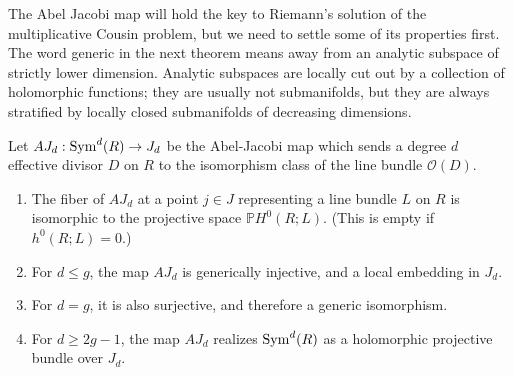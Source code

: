 \documentclass[12pt]{article}
\begin{document}
The Abel Jacobi map will hold the key to Riemann's solution of the multiplicative Cousin problem,
but we need to settle some of its properties first.
The word generic in the next theorem means
away from an analytic subspace of strictly lower dimension.
Analytic subspaces are locally cut out by a collection of holomorphic functions; they are usually not submanifolds,
but they are always stratified by locally closed submanifolds of decreasing dimensions.

\begin{theorem}
    Let $AJ_d : \operatorname{Sym}^d(R) \to J_d$ be the Abel-Jacobi map which sends a degree $d$ effective divisor $D$ on $R$ to the isomorphism class of the line bundle $\mathcal{O}(D)$.
    \begin{enumerate}
        \item The fiber of $AJ_d$ at a point $j \in J$ representing a line bundle $L$ on $R$
              is isomorphic to the projective space $\mathbb{P}H^0(R;L)$.
              (This is empty if $h^0(R;L)=0$.)
        \item For $d \le g$, the map $AJ_d$ is generically injective,
              and a local embedding in $J_d$.
        \item For $d = g$, it is also surjective,
              and therefore a generic isomorphism.
        \item For $d \ge 2g - 1$, the map $AJ_d$ realizes $\operatorname{Sym}^d(R)$
              as a holomorphic projective bundle over $J_d$.
    \end{enumerate}
\end{theorem}
\end{document}
